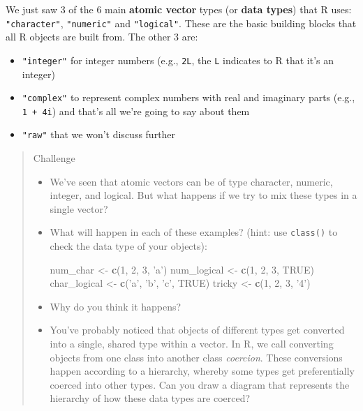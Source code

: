 \documentclass[]{book}
\newenvironment{Shaded}{\begin{snugshade}}{\end{snugshade}}
\newcommand{\KeywordTok}[1]{\textcolor[rgb]{0.13,0.29,0.53}{\textbf{#1}}}
\newcommand{\DecValTok}[1]{\textcolor[rgb]{0.00,0.00,0.81}{#1}}
\newcommand{\StringTok}[1]{\textcolor[rgb]{0.31,0.60,0.02}{#1}}
\newcommand{\OtherTok}[1]{\textcolor[rgb]{0.56,0.35,0.01}{#1}}
\newcommand{\NormalTok}[1]{#1}
\providecommand{\tightlist}{%
  \setlength{\itemsep}{0pt}\setlength{\parskip}{0pt}}
\theoremstyle{definition}
\theoremstyle{definition}
\theoremstyle{definition}
\theoremstyle{remark}
\begin{document}
We just saw 3 of the 6 main \textbf{atomic vector} types (or
\textbf{data types}) that R uses: \texttt{"character"},
\texttt{"numeric"} and \texttt{"logical"}. These are the basic building
blocks that all R objects are built from. The other 3 are:

\begin{itemize}
\tightlist
\item
  \texttt{"integer"} for integer numbers (e.g., \texttt{2L}, the
  \texttt{L} indicates to R that it's an integer)
\item
  \texttt{"complex"} to represent complex numbers with real and
  imaginary parts (e.g., \texttt{1\ +\ 4i}) and that's all we're going
  to say about them
\item
  \texttt{"raw"} that we won't discuss further
\end{itemize}

\begin{quote}
Challenge

\begin{itemize}
\item
  We've seen that atomic vectors can be of type character, numeric,
  integer, and logical. But what happens if we try to mix these types in
  a single vector? 
\item
  What will happen in each of these examples? (hint: use
  \texttt{class()} to check the data type of your objects):

\begin{Shaded}
\begin{Highlighting}[]
\NormalTok{num_char <-}\StringTok{ }\KeywordTok{c}\NormalTok{(}\DecValTok{1}\NormalTok{, }\DecValTok{2}\NormalTok{, }\DecValTok{3}\NormalTok{, }\StringTok{'a'}\NormalTok{)}
\NormalTok{num_logical <-}\StringTok{ }\KeywordTok{c}\NormalTok{(}\DecValTok{1}\NormalTok{, }\DecValTok{2}\NormalTok{, }\DecValTok{3}\NormalTok{, }\OtherTok{TRUE}\NormalTok{)}
\NormalTok{char_logical <-}\StringTok{ }\KeywordTok{c}\NormalTok{(}\StringTok{'a'}\NormalTok{, }\StringTok{'b'}\NormalTok{, }\StringTok{'c'}\NormalTok{, }\OtherTok{TRUE}\NormalTok{)}
\NormalTok{tricky <-}\StringTok{ }\KeywordTok{c}\NormalTok{(}\DecValTok{1}\NormalTok{, }\DecValTok{2}\NormalTok{, }\DecValTok{3}\NormalTok{, }\StringTok{'4'}\NormalTok{)}
\end{Highlighting}
\end{Shaded}
\item
  Why do you think it happens? 
\item
  You've probably noticed that objects of different types get converted
  into a single, shared type within a vector. In R, we call converting
  objects from one class into another class \emph{coercion}. These
  conversions happen according to a hierarchy, whereby some types get
  preferentially coerced into other types. Can you draw a diagram that
  represents the hierarchy of how these data types are coerced? 
\end{itemize}
\end{quote}
\end{document}
